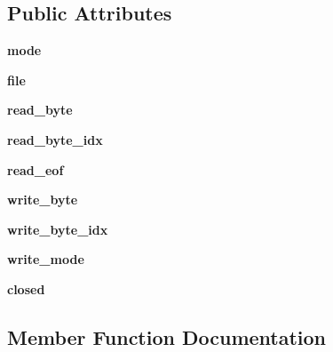 \subsection*{Public Attributes}
\begin{DoxyCompactItemize}
\item 
\mbox{\label{classbitStream_1_1BitStream_a162212996aea5c2ccd410db5b6d52d0e}} 
{\bfseries mode}
\item 
\mbox{\label{classbitStream_1_1BitStream_a666dddb385e1437a3b497c7b6abd6ed6}} 
{\bfseries file}
\item 
\mbox{\label{classbitStream_1_1BitStream_a11ecdd766c225dbdf2afe2579e4923f0}} 
{\bfseries read\+\_\+byte}
\item 
\mbox{\label{classbitStream_1_1BitStream_a0249dd893ace7bcf069e53cd61710398}} 
{\bfseries read\+\_\+byte\+\_\+idx}
\item 
\mbox{\label{classbitStream_1_1BitStream_ae7d7b18f990ca52ad52f308eae667e2d}} 
{\bfseries read\+\_\+eof}
\item 
\mbox{\label{classbitStream_1_1BitStream_ac5148d5bfff841debf52196d2b823352}} 
{\bfseries write\+\_\+byte}
\item 
\mbox{\label{classbitStream_1_1BitStream_adc4d20f9d070c6865170c981acfcc2ba}} 
{\bfseries write\+\_\+byte\+\_\+idx}
\item 
\mbox{\label{classbitStream_1_1BitStream_a41b30470a39ae96aaefc4a748bb6ea13}} 
{\bfseries write\+\_\+mode}
\item 
\mbox{\label{classbitStream_1_1BitStream_ad2d5bfb86de2d0bb0900b355c805e094}} 
{\bfseries closed}
\end{DoxyCompactItemize}


\subsection{Member Function Documentation}
\mbox{\label{classbitStream_1_1BitStream_aef1601d4c082bb0cc73cba258d52cc18}} 
